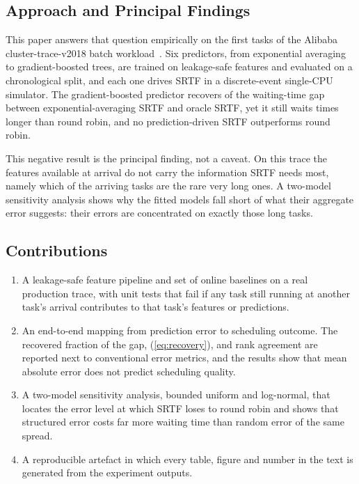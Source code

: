 \documentclass[conference]{IEEEtran}
\begin{document}
\subsection{Approach and Principal Findings}
This paper answers that question empirically on the first \nTasks{} tasks of
the Alibaba cluster-trace-v2018 batch
workload~\cite{cheng_characterizing_2018}. Six predictors, from exponential
averaging to gradient-boosted trees, are trained on leakage-safe features and
evaluated on a chronological split, and each one drives SRTF in a
discrete-event single-CPU simulator. The gradient-boosted predictor recovers
\headline{} of the waiting-time gap between exponential-averaging SRTF and
oracle SRTF, yet it still waits \ratioGBMRR{} times longer than round robin,
and no prediction-driven SRTF outperforms round robin.

This negative result is the principal finding, not a caveat. On this trace
the features available at arrival do not carry the information SRTF needs
most, namely which of the arriving tasks are the rare very long ones. A
two-model sensitivity analysis shows why the fitted models fall short of
what their aggregate error suggests: their errors are concentrated on
exactly those long tasks.

\subsection{Contributions}
\begin{enumerate}
  \item A leakage-safe feature pipeline and set of online baselines on a real
    production trace, with unit tests that fail if any task still running at
    another task's arrival contributes to that task's features or
    predictions.
  \item An end-to-end mapping from prediction error to scheduling outcome.
    The recovered fraction of the gap, (\ref{eq:recovery}), and rank
    agreement are reported next to conventional error metrics, and the
    results show that mean absolute error does not predict scheduling
    quality.
  \item A two-model sensitivity analysis, bounded uniform and log-normal,
    that locates the error level at which SRTF loses to round robin and
    shows that structured error costs far more waiting time than random
    error of the same spread.
  \item A reproducible artefact in which every table, figure and number in
    the text is generated from the experiment outputs.
\end{enumerate}
\end{document}

